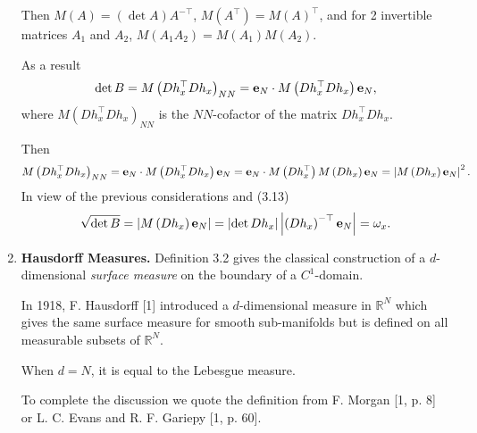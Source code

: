 \documentclass{book}
\numberwithin{equation}{section}
\begin{document}
\begin{enumerate}
    Then $M(A) = (\det A)A^{-\top}$, $M(A^\top) = M(A)^\top$, and for 2 invertible matrices $A_1$ and $A_2$, $M(A_1A_2) = M(A_1)M(A_2)$.
    
    As a result
    \begin{align*}
        \det B = M\left(Dh_x^\top Dh_x\right)_{NN} = {\bf e}_N\cdot M\left(Dh_x^\top Dh_x\right){\bf e}_N,
    \end{align*}
    where $M\left(Dh_x^\top Dh_x\right)_{NN}$ is the $NN$-cofactor of the matrix $Dh_x^\top Dh_x$.
    
    Then
    \begin{align*}
        M\left(Dh_x^\top Dh_x\right)_{NN} = {\bf e}_N\cdot M\left(Dh_x^\top Dh_x\right){\bf e}_N = {\bf e}_N\cdot M\left(Dh_x^\top\right)M\left(Dh_x\right){\bf e}_N = \left|M\left(Dh_x\right){\bf e}_N\right|^2.
    \end{align*}
    In view of the previous considerations and (3.13)
    \begin{align*}
        \sqrt{\det B} = \left|M\left(Dh_x\right){\bf e}_N\right| = \left|\det Dh_x\right|\left|\left(Dh_x\right)^{-\top}{\bf e}_N\right| = \omega_x.
    \end{align*}
    \item \textbf{Hausdorff Measures.} Definition 3.2 gives the classical construction of a $d$-dimensional \textit{surface measure} on the boundary of a $C^1$-domain.
    
    In 1918, F. Hausdorff [1] introduced a $d$-dimensional measure in $\mathbb{R}^N$ which gives the same surface measure for smooth sub-manifolds but is defined on all measurable subsets of $\mathbb{R}^N$.
    
    When $d = N$, it is equal to the Lebesgue measure.
    
    To complete the discussion we quote the definition from F. Morgan [1, p. 8] or L. C. Evans and R. F. Gariepy [1, p. 60].
    

\end{enumerate}
\end{document}
